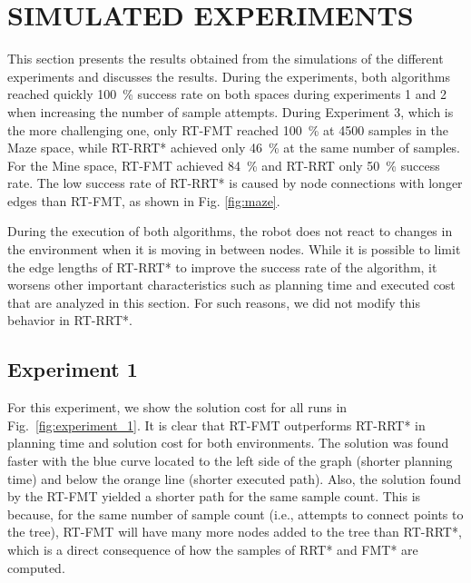 \section{SIMULATED EXPERIMENTS}
\label{sec:results}

This section presents the results obtained from the simulations of the different experiments and discusses the results. During the experiments, both algorithms reached quickly 100~\% success rate on both spaces during experiments 1 and 2 when increasing the number of sample attempts. During Experiment 3, which is the more challenging one, only RT-FMT reached 100~\% at 4500 samples in the Maze space, while RT-RRT* achieved only 46~\% at the same number of samples. For the Mine space, RT-FMT achieved 84~\% and RT-RRT only 50~\% success rate. The low success rate of RT-RRT* is caused by node connections with longer edges than RT-FMT, as shown in Fig. \ref{fig:maze}. 

During the execution of both algorithms, the robot does not react to changes in the environment when it is moving in between nodes. While it is possible to limit the edge lengths of RT-RRT* to improve the success rate of the algorithm, it worsens other important characteristics such as planning time and executed cost that are analyzed in this section. For such reasons, we did not modify this behavior in RT-RRT*.



\subsection{Experiment 1}

For this experiment, we show the solution cost for all runs in Fig.~\ref{fig:experiment_1}. It is clear that RT-FMT outperforms RT-RRT* in planning time and solution cost for both environments. The solution was found faster with the blue curve located to the left side of the graph (shorter planning time) and below the orange line (shorter executed path). Also, the solution found by the RT-FMT yielded a shorter path for the same sample count. This is because, for the same number of sample count (i.e., attempts to connect points to the tree), RT-FMT will have many more nodes added to the tree than RT-RRT*, which is a direct consequence of how the samples of RRT* and FMT* are computed.

